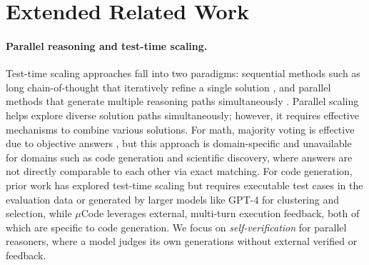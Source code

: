 \clearpage
\section{Extended Related Work}
\label{extended_related_works}

\paragraph{Parallel reasoning and test-time scaling.}
Test-time scaling approaches fall into two paradigms: sequential methods such as long chain-of-thought that iteratively refine a single solution \citep{madaan2023selfrefine}, and parallel methods that generate multiple reasoning paths simultaneously \citep{DBLP:journals/corr/abs-2110-14168, setlur2025scalingtesttimecomputeverification,
pan2025learning, zhao2025samplescrutinizescaleeffective, singhi2025whentosolve, lian2025threadweaveradaptivethreadingefficient}. Parallel scaling helps explore diverse solution paths simultaneously; however, it requires effective mechanisms to combine various solutions. For math, majority voting is effective due to objective answers \citep{wang2023selfconsistency, snell2024scalingllmtesttimecompute, wu2025inferencescalinglawsempirical}, but this approach is domain-specific and unavailable for domains such as code generation and scientific discovery, where answers are not directly comparable to each other via exact matching. For code generation, prior work \citep{li2025stesttimescaling} has explored test-time scaling but requires executable test cases in the evaluation data or generated by larger models like GPT-4 for clustering and selection, while $\mu$Code \citep{jain2025multiturn} leverages external, multi-turn execution feedback, both of which are specific to code generation.
We focus on \textit{self-verification} for parallel reasoners, where a model judges its own generations without external verified or feedback.

